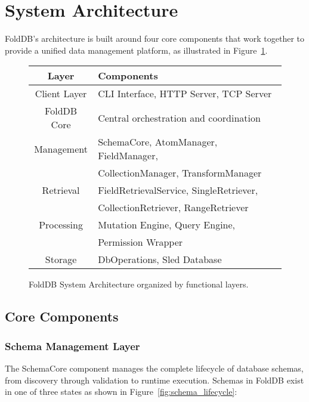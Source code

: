 \documentclass[11pt,a4paper]{article}
\begin{document}
\section{System Architecture}

FoldDB's architecture is built around four core components that work together to provide a unified data management platform, as illustrated in Figure~\ref{fig:system_architecture}.

\begin{figure}[htbp]
\centering
\begin{tabular}{|c|l|}
\hline
\textbf{Layer} & \textbf{Components} \\
\hline
\hline
\rowcolor{processingcolor}
Client Layer & CLI Interface, HTTP Server, TCP Server \\
\hline
\rowcolor{corecolor}
FoldDB Core & Central orchestration and coordination \\
\hline
\rowcolor{managementcolor}
Management & SchemaCore, AtomManager, FieldManager, \\
& CollectionManager, TransformManager \\
\hline
\rowcolor{retrievalcolor}
Retrieval & FieldRetrievalService, SingleRetriever, \\
& CollectionRetriever, RangeRetriever \\
\hline
\rowcolor{processingcolor}
Processing & Mutation Engine, Query Engine, \\
& Permission Wrapper \\
\hline
\rowcolor{storagecolor}
Storage & DbOperations, Sled Database \\
\hline
\end{tabular}
\caption{FoldDB System Architecture organized by functional layers.}
\label{fig:system_architecture}
\end{figure}

\subsection{Core Components}

\subsubsection{Schema Management Layer}
The SchemaCore component manages the complete lifecycle of database schemas, from discovery through validation to runtime execution. Schemas in FoldDB exist in one of three states as shown in Figure~\ref{fig:schema_lifecycle}:
\end{document}
